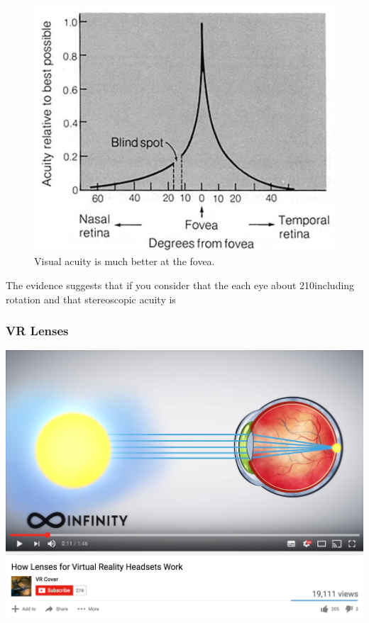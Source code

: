 \begin{frame}
	\begin{figure}
		\includegraphics[scale=.9]{assets/acuity} 
		\caption{Visual acuity is much better at the fovea.}
	\end{figure}
\end{frame}

\begin{frame}
The evidence suggests that if you consider that the each eye about 210\degree including rotation and that stereoscopic acuity is
\end{frame}
\begin{frame}
	\frametitle{VR Lenses}
	\begin{center}
		\href{https://www.youtube.com/watch?v=NCBEYaC876A}{ \includegraphics[scale=.3]{assets/lenses}  }
	\end{center}
\end{frame}

